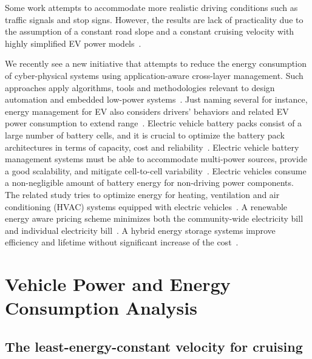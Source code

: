 \documentclass{IEEEtran}
\begin{document}
Some work attempts to accommodate more realistic driving conditions such as traffic signals and stop signs. However, the results are lack of practicality due to the assumption of a constant road slope and a constant cruising velocity with highly simplified EV power models~\cite{Yan:NAPS14, Dib:CEP14, Wu:ITS15}. 

We recently see a new initiative that attempts to reduce the energy consumption of cyber-physical systems using application-aware cross-layer management. Such approaches apply algorithms, tools and methodologies relevant to design automation and embedded low-power systems~\cite{Seshia:TCAD17}. 
Just naming several for instance, energy management for EV also considers drivers' behaviors and related EV power consumption to extend range~\cite{Vatanparvar:TSG18,Vatanparvar:TODAES17}.
Electric vehicle battery packs consist of a large number of battery cells, and it is crucial to optimize the battery pack architectures in terms of capacity, cost and reliability~\cite{Wu:TCAD13,Shaheer:RTCSA17}. 
Electric vehicle battery management systems must be able to accommodate multi-power sources, provide a good scalability, and mitigate cell-to-cell variability~\cite{Shin:TCAD15}.
Electric vehicles consume a non-negligible amount of battery energy for non-driving power components. The related study tries to optimize energy for heating, ventilation and air conditioning (HVAC) systems equipped with electric vehicles~\cite{Zhao:ICCAD15,Vatanparvar:TECS18}. 
A renewable energy aware pricing scheme minimizes both the community-wide electricity bill and individual electricity bill~\cite{Liu:TPDS17}.
A hybrid energy storage systems improve efficiency and lifetime without significant increase of the cost~\cite{Xie:TCAD13, Kim:JPS14}. 




\section{Vehicle Power and Energy Consumption Analysis} \label{sec:energy consumption}

\subsection{The least-energy-constant velocity for cruising} \label{subsec:opt-cruising}
\end{document}

